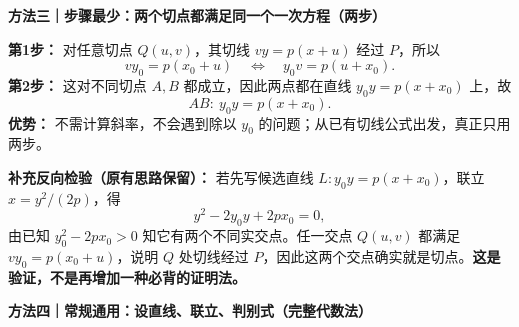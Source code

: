 \begin{proofbox}
\medskip
\par\noindent\begin{minipage}{\linewidth}
\textbf{\textcolor{CProof}{方法三｜步骤最少：两个切点都满足同一个一次方程（两步）}}
\par\smallskip\begin{center}\end{center}\par\smallskip
\end{minipage}\par
\textbf{第1步：} 对任意切点 $Q(u,v)$，其切线 $vy=p(x+u)$ 经过 $P$，所以
\[
 vy_0=p(x_0+u)\quad\Longleftrightarrow\quad y_0v=p(u+x_0).
\]
\textbf{第2步：} 这对不同切点 $A,B$ 都成立，因此两点都在直线 $y_0y=p(x+x_0)$ 上，故
\[\boxed{AB:\ y_0y=p(x+x_0)}.\]
\textbf{优势：} 不需计算斜率，不会遇到除以 $y_0$ 的问题；从已有切线公式出发，真正只用两步。

\textbf{补充反向检验（原有思路保留）：} 若先写候选直线 $L:y_0y=p(x+x_0)$，联立 $x=y^2/(2p)$，得
\[
 y^2-2y_0y+2px_0=0,
\]
由已知 $y_0^2-2px_0>0$ 知它有两个不同实交点。任一交点 $Q(u,v)$ 都满足 $vy_0=p(x_0+u)$，说明 $Q$ 处切线经过 $P$，因此这两个交点确实就是切点。\textbf{这是验证，不是再增加一种必背的证明法。}
\par\smallskip\begin{center}\end{center}

\medskip
\par\noindent\begin{minipage}{\linewidth}
\textbf{\textcolor{CProof}{方法四｜常规通用：设直线、联立、判别式（完整代数法）}}
\par\smallskip\begin{center}\end{center}\par\smallskip
\end{minipage}\par


\end{proofbox}
